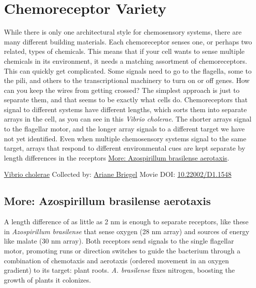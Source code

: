 \documentclass[]{tufte-book}
\begin{document}
\hypertarget{chemoreceptor-variety}{%
\section{Chemoreceptor Variety}\label{chemoreceptor-variety}}

While there is only one architectural style for chemosensory systems, there are many different building materials. Each chemoreceptor senses one, or perhaps two related, types of chemicals. This means that if your cell wants to sense multiple chemicals in its environment, it needs a matching assortment of chemoreceptors. This can quickly get complicated. Some signals need to go to the flagella, some to the pili, and others to the transcriptional machinery to turn on or off genes. How can you keep the wires from getting crossed? The simplest approach is just to separate them, and that seems to be exactly what cells do. Chemoreceptors that signal to different systems have different lengths, which sorts them into separate arrays in the cell, as you can see in this \emph{Vibrio cholerae}. The shorter arrays signal to the flagellar motor, and the longer array signals to a different target we have not yet identified. Even when multiple chemosensory systems signal to the same target, arrays that respond to different environmental cues are kept separate by length differences in the receptors \protect\hyperlink{Azospirillum_brasilense_aerotaxis}{More: Azospirillum brasilense aerotaxis}.



\hypertarget{htmlwidget-ced3b5969dafe27c7cc6}{}

\label{fig:7-4}\protect\hyperlink{tree}{Vibrio cholerae} Collected by: \protect\hyperlink{ariane_briegel}{Ariane Briegel} Movie DOI: \href{https://doi.org/10.22002/D1.1548}{10.22002/D1.1548}

\hypertarget{Azospirillum_brasilense_aerotaxis}{%
\subsection*{More: Azospirillum brasilense aerotaxis}\label{Azospirillum_brasilense_aerotaxis}}

A length difference of as little as 2 nm is enough to separate receptors, like these in \emph{Azospirillum brasilense} that sense oxygen (28 nm array) and sources of energy like malate (30 nm array). Both receptors send signals to the single flagellar motor, promoting runs or direction switches to guide the bacterium through a combination of chemotaxis and aerotaxis (ordered movement in an oxygen gradient) to its target: plant roots. \emph{A. brasilense} fixes nitrogen, boosting the growth of plants it colonizes.
\end{document}
